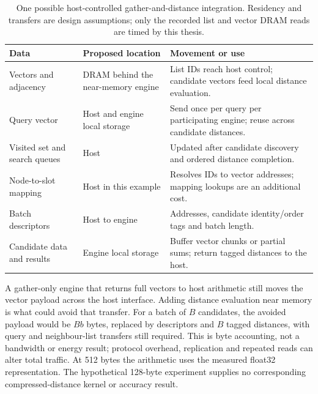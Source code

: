 \begin{table}[htbp]\centering\small
\caption[Data residency and transfers in the proposed PIM path]{One possible host-controlled gather-and-distance integration. Residency and transfers are design assumptions; only the recorded list and vector DRAM reads are timed by this thesis.}\label{tab:pim-residency}
\begin{tabular}{>{\raggedright\arraybackslash}p{}>{\raggedright\arraybackslash}p{}>{\raggedright\arraybackslash}p{}}
\toprule
Data & Proposed location & Movement or use\\\midrule
Vectors and adjacency & DRAM behind the near-memory engine & List IDs reach host control; candidate vectors feed local distance evaluation.\\
Query vector & Host and engine local storage & Send once per query per participating engine; reuse across candidate distances.\\
Visited set and search queues & Host & Updated after candidate discovery and ordered distance completion.\\
Node-to-slot mapping & Host in this example & Resolves IDs to vector addresses; mapping lookups are an additional cost.\\
Batch descriptors & Host to engine & Addresses, candidate identity/order tags and batch length.\\
Candidate data and results & Engine local storage & Buffer vector chunks or partial sums; return tagged distances to the host.\\\bottomrule
\end{tabular}
\end{table}

A gather-only engine that returns full vectors to host arithmetic still moves the vector payload across the host interface. Adding distance evaluation near memory is what could avoid that transfer. For a batch of $B$ candidates, the avoided payload would be $Bb$ bytes, replaced by descriptors and $B$ tagged distances, with query and neighbour-list transfers still required. This is byte accounting, not a bandwidth or energy result; protocol overhead, replication and repeated reads can alter total traffic. At 512 bytes the arithmetic uses the measured float32 representation. The hypothetical 128-byte experiment supplies no corresponding compressed-distance kernel or accuracy result.

